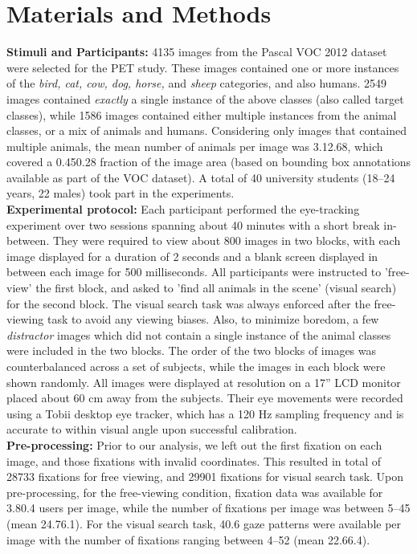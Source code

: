\documentclass{article}
\begin{document}
\section{Materials and Methods}\label{EP}
\textbf{Stimuli and Participants:} 4135 images from the Pascal VOC 2012 dataset~\cite{pascalvoc2012} were selected for the PET study. These images contained one or more instances of the \textit{bird, cat, cow, dog, horse,} and \textit{sheep} categories, and also humans. 2549 images contained \textit{exactly} a single instance of the above classes (also called target classes), while 1586 images contained either multiple instances from the animal classes, or a mix of animals and humans. Considering only images that contained multiple animals, the mean number of animals per image was 3.12.68, which covered a 0.450.28 fraction of the image area (based on bounding box annotations available as part of the VOC dataset). A total of 40 university students (18--24 years, 22 males) took part in the experiments. \\

\textbf{Experimental protocol:} Each participant performed the eye-tracking experiment over two sessions spanning about 40 minutes with a short break in-between. They were required to view about 800 images in two blocks, with each image displayed for a duration of 2 seconds and a blank screen displayed in between each image for 500 milliseconds. All participants were instructed to 'free-view' the first block, and asked to 'find all animals in the scene' (visual search) for the second block. The visual search task was always enforced after the free-viewing task to avoid any viewing biases. Also, to minimize boredom, a few \textit{distractor} images which did not contain a single instance of the animal classes were included in the two blocks. The order of the two blocks of images was counterbalanced across a set of subjects, while the images in each block were shown randomly. All images were displayed at  resolution on a 17'' LCD monitor placed about 60 cm away from the subjects. Their eye movements were recorded using a Tobii desktop eye tracker, which has a 120 Hz sampling frequency and is accurate to within  visual angle upon successful calibration. \\



\textbf{Pre-processing:} Prior to our analysis, we left out the first fixation on each image, and those fixations with invalid  coordinates. This resulted in total of 28733 fixations for free viewing, and 29901 fixations for visual search task. Upon pre-processing, for the free-viewing condition, fixation data was available for 3.80.4 users per image, while the number of fixations per image was between 5--45 (mean 24.76.1). For the visual search task, 40.6 gaze patterns were available per image with the number of fixations ranging between 4--52 (mean 22.66.4).
\end{document}
